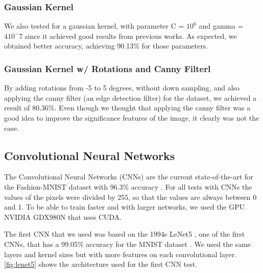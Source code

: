 \documentclass[twoside,twocolumn]{article}
\begin{document}
\subsubsection{Gaussian Kernel}

We also tested for a gaussian kernel, with parameter C = $10^6$ and gamma = $4 10^-7$ since it achieved good results from previous works.
As expected, we obtained better accuracy, achieving 90.13\% for those parameters.

\subsubsection{Gaussian Kernel w/ Rotations and Canny Filterl}

By adding rotations from -5 to 5 degrees, without down sampling, and also applying the canny filter (an edge detection filter)
for the dataset, we achieved a result of 80.36\%. Even though we thought that applying the canny filter was a good idea to improve
the significance features of the image, it clearly was not the case.

\subsection{Convolutional Neural Networks}

     The Convolutional Neural Networks (CNNs) are the current state-of-the-art for the Fashion-MNIST dataset with 96.3\% accuracy \cite{randomerasingdataaugmentationpaper}. For all tests with CNNs the values of the pixels were divided by 255, so that the values are always between 0 and 1. To be able to train faster and with larger networks, we used the GPU NVIDIA GDX980N that uses CUDA.
     
      The first CNN that we used was based on the 1994s LeNet5 \cite{yannLeCun:1998}, one of the first CNNs, that has a 99.05\% accuracy for the MNIST dataset \cite{yannLeCun:mnist}. We used the same layers and kernel sizes but with more features on each convolutional layer. \ref{fig:lenet5} shows the architecture used for the first CNN test.
\end{document}
